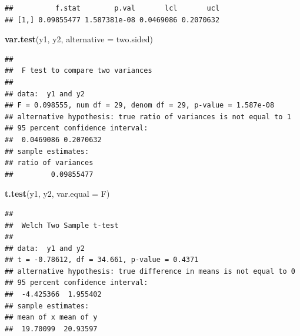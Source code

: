 \documentclass[
]{article}
\newenvironment{Shaded}{\begin{snugshade}}{\end{snugshade}}
\newcommand{\AttributeTok}[1]{\textcolor[rgb]{0.13,0.29,0.53}{#1}}
\newcommand{\FunctionTok}[1]{\textcolor[rgb]{0.13,0.29,0.53}{\textbf{#1}}}
\newcommand{\NormalTok}[1]{#1}
\newcommand{\StringTok}[1]{\textcolor[rgb]{0.31,0.60,0.02}{#1}}
\begin{document}
\begin{verbatim}
##          f.stat        p.val       lcl       ucl
## [1,] 0.09855477 1.587381e-08 0.0469086 0.2070632
\end{verbatim}

\begin{Shaded}
\begin{Highlighting}[]
\FunctionTok{var.test}\NormalTok{(y1, y2, }\AttributeTok{alternative =} \StringTok{\textquotesingle{}two.sided\textquotesingle{}}\NormalTok{)}
\end{Highlighting}
\end{Shaded}

\begin{verbatim}
## 
##  F test to compare two variances
## 
## data:  y1 and y2
## F = 0.098555, num df = 29, denom df = 29, p-value = 1.587e-08
## alternative hypothesis: true ratio of variances is not equal to 1
## 95 percent confidence interval:
##  0.0469086 0.2070632
## sample estimates:
## ratio of variances 
##         0.09855477
\end{verbatim}

\begin{Shaded}
\begin{Highlighting}[]
\FunctionTok{t.test}\NormalTok{(y1, y2, }\AttributeTok{var.equal =}\NormalTok{ F)}
\end{Highlighting}
\end{Shaded}

\begin{verbatim}
## 
##  Welch Two Sample t-test
## 
## data:  y1 and y2
## t = -0.78612, df = 34.661, p-value = 0.4371
## alternative hypothesis: true difference in means is not equal to 0
## 95 percent confidence interval:
##  -4.425366  1.955402
## sample estimates:
## mean of x mean of y 
##  19.70099  20.93597
\end{verbatim}
\end{document}
